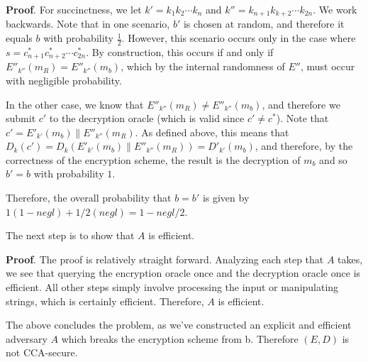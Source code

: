 \documentclass{article}
\begin{document}
\begin{enumerate}[,label=\alph*.]
\begin{enumerate}[noitemsep,topsep=\mdcompacttopsep]
\begin{mdbmarginx}{1ex}{0pt}{1ex}{0pt}%
\noindent{}\textbf{Proof}.  For succinctness, we let $k' = k_1k_2 \cdots k_n$ and $k'' = k_{n+1}k_{k+2} \cdots  k_{2n}$. 
We work backwards. Note that in one scenario, $b'$ is chosen at random, and therefore it equals
$b$ with probability $\frac{1}{2}$. However, this scenario occurs only in the case where 
$s =  c^*_{n+1}c^*_{n+2} \cdots c^*_{2n}$. By construction, this occurs if and only if $E''_{k''}(m_R) = E''_{k''}(m_b)$,
which by the internal randomness of $E''$, must occur with negligible probability.%

In the other case, we know that $E''_{k''}(m_R) \neq E''_{k''}(m_b)$, and therefore we submit
$c'$ to the decryption oracle (which is valid since $c' \neq c^*$). Note that $c' = E'_{k'}(m_b) \| E''_{k''}(m_R)$.
As defined above, this means that $D_k(c') = D_k(E'_{k'}(m_b) \| E''_{k''}(m_R)) = D'_{k'}(m_b)$, and therefore,
by the correctness of the encryption scheme, the result is the decryption of $m_b$ and so $b' = b$ with
probability $1$.%

Therefore, the overall probability that $b = b'$ is given by $1(1-negl) + 1/2(negl) = 1 - negl/2$.
\mdfloatright{\ensuremath{\Box}}%
\end{mdbmarginx}%
\end{enumerate}%

The next step is to show that $A$ is efficient.%

\begin{mdbmarginx}{1ex}{0pt}{1ex}{0pt}%
\noindent{}\textbf{Proof}.  The proof is relatively straight forward. Analyzing each step that $A$ takes, we see that querying the
encryption oracle once and the decryption oracle once is efficient. All other steps simply involve processing
the input or manipulating strings, which is certainly efficient. Therefore, $A$ is efficient.
\mdfloatright{\ensuremath{\Box}}%
\end{mdbmarginx}%

The above concludes the problem, as we've constructed an explicit and efficient adversary $A$ which
breaks the encryption scheme from b. Therefore $(E,D)$ is not CCA-secure.%
\end{enumerate}%
\end{document}

